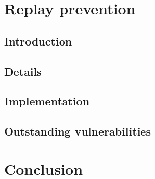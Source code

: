 \documentclass[a4paper,11pt]{article}
\begin{document}
\section{Replay prevention}

\subsection{Introduction}

\subsection{Details}

\subsection{Implementation}

\subsection{Outstanding vulnerabilities}

\section{Conclusion}
\end{document}
